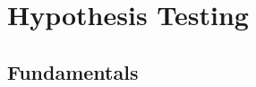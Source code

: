 \documentclass[../main]{subfiles}
\begin{document}
\chapter{Hypothesis Testing}
\section{Fundamentals}
\end{document}
